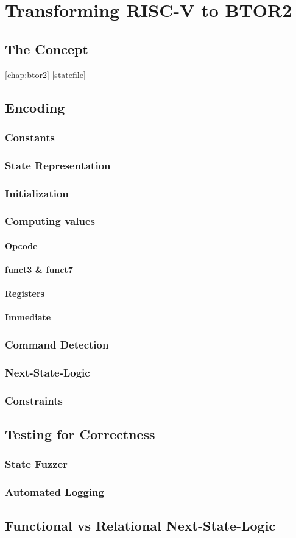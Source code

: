 \chapter{Transforming RISC-V to BTOR2}\label{chap:riscv_to_btor2}
\section{The Concept}

\ref{chap:btor2} \ref{statefile} 

\section{Encoding}
\subsection{Constants}
\subsection{State Representation}
\subsection{Initialization}
\subsection{Computing values}
\subsubsection{Opcode}
\subsubsection{funct3 \& funct7}
\subsubsection{Registers}
\subsubsection{Immediate}
\subsection{Command Detection}
\subsection{Next-State-Logic}
\subsection{Constraints}
\section{Testing for Correctness}
\subsection{State Fuzzer}
\subsection{Automated Logging}
\section{Functional vs Relational Next-State-Logic}